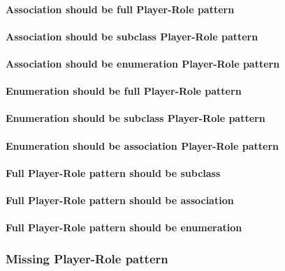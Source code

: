 \paragraph{Association should be full Player-Role pattern}


\paragraph{Association should be subclass Player-Role pattern}


\paragraph{Association should be enumeration Player-Role pattern}


\paragraph{Enumeration should be full Player-Role pattern}


\paragraph{Enumeration should be subclass Player-Role pattern}


\paragraph{Enumeration should be association Player-Role pattern}


\paragraph{Full Player-Role pattern should be subclass}


\paragraph{Full Player-Role pattern should be association}


\paragraph{Full Player-Role pattern should be enumeration}


\subsubsection{Missing Player-Role pattern}


